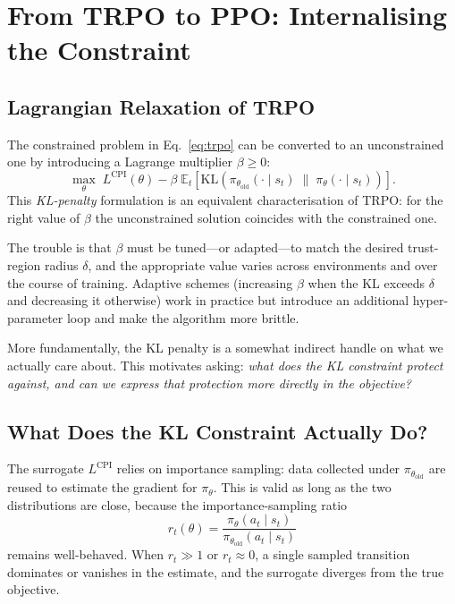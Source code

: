 \documentclass[12pt, a4paper]{article}
\theoremstyle{definition}
\theoremstyle{plain}
\theoremstyle{remark}
\newcommand{\E}{\mathbb{E}}
\newcommand{\pith}{\pi_\theta}
\newcommand{\piold}{\pi_{\theta_\mathrm{old}}}
\newcommand{\KL}{\mathrm{KL}}
\begin{document}
\section{From TRPO to PPO: Internalising the Constraint}
\label{sec:trpo_to_ppo}

\subsection{Lagrangian Relaxation of TRPO}

The constrained problem in Eq.~\eqref{eq:trpo} can be converted to an unconstrained
one by introducing a Lagrange multiplier $\beta \geq 0$:
\begin{equation}
  \max_\theta\;
    L^{\mathrm{CPI}}(\theta)
    - \beta\;
    \E_t\!\left[\KL\!\left(\piold(\cdot \mid s_t) \;\|\; \pith(\cdot \mid s_t)\right)\right].
  \label{eq:kl_penalty}
\end{equation}
This \emph{KL-penalty} formulation is an equivalent characterisation of TRPO: for the
right value of $\beta$ the unconstrained solution coincides with the constrained one.

The trouble is that $\beta$ must be tuned---or adapted---to match the desired
trust-region radius $\delta$, and the appropriate value varies across environments and
over the course of training.  Adaptive schemes (increasing $\beta$ when the KL exceeds
$\delta$ and decreasing it otherwise) work in practice but introduce an additional
hyper-parameter loop and make the algorithm more brittle.

More fundamentally, the KL penalty is a somewhat indirect handle on what we actually
care about.  This motivates asking: \emph{what does the KL constraint protect against,
and can we express that protection more directly in the objective?}

\subsection{What Does the KL Constraint Actually Do?}

The surrogate $L^{\mathrm{CPI}}$ relies on importance sampling: data collected under
$\piold$ are reused to estimate the gradient for $\pith$.  This is valid as long as
the two distributions are close, because the importance-sampling ratio
\begin{equation}
  r_t(\theta) = \frac{\pith(a_t \mid s_t)}{\piold(a_t \mid s_t)}
\end{equation}
remains well-behaved.  When $r_t \gg 1$ or $r_t \approx 0$, a single sampled
transition dominates or vanishes in the estimate, and the surrogate diverges from the
true objective.
\end{document}
